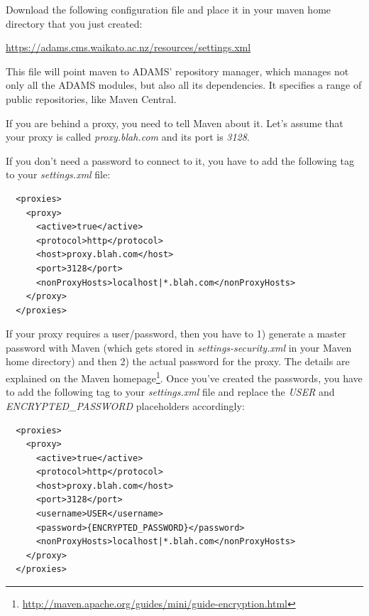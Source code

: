 Download the following configuration file and place it in your maven home directory that you just created:

{\scriptsize \url{https://adams.cms.waikato.ac.nz/resources/settings.xml}{}}

\noindent This file will point maven to ADAMS' repository manager, which manages not only all
the ADAMS modules, but also all its dependencies. It specifies a range of public
repositories, like Maven Central.

If you are behind a proxy, you need to tell Maven about it. Let's assume that 
your proxy is called \textit{proxy.blah.com} and its port is \textit{3128}.

If you don't need a password to connect to it, you have to add the 
following tag to your \textit{settings.xml} file:
\begin{verbatim}
  <proxies>
    <proxy>
      <active>true</active>
      <protocol>http</protocol>
      <host>proxy.blah.com</host>
      <port>3128</port>
      <nonProxyHosts>localhost|*.blah.com</nonProxyHosts>
    </proxy>
  </proxies>
\end{verbatim}

If your proxy requires a user/password, then you have to 1) generate a master 
password with Maven (which gets stored in \textit{settings-security.xml} in your
Maven home directory) and then 2) the actual password for the proxy. The details are explained 
on the Maven homepage\footnote{\url{http://maven.apache.org/guides/mini/guide-encryption.html}{}}. 
Once you've created the passwords, you have to add the following tag to 
your \textit{settings.xml} file and replace the \textit{USER} and 
\textit{ENCRYPTED\_PASSWORD} placeholders accordingly:
\begin{verbatim}
  <proxies>
    <proxy>
      <active>true</active>
      <protocol>http</protocol>
      <host>proxy.blah.com</host>
      <port>3128</port>
      <username>USER</username>
      <password>{ENCRYPTED_PASSWORD}</password>
      <nonProxyHosts>localhost|*.blah.com</nonProxyHosts>
    </proxy>
  </proxies>
\end{verbatim}

